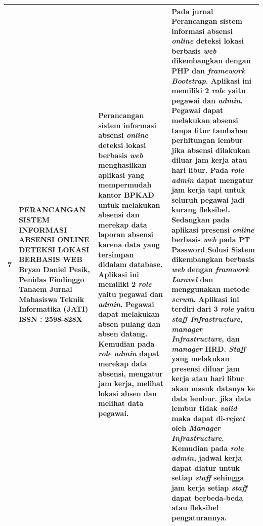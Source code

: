 \begin{longtable}{ |p{0.5cm}|p{3cm}|p{7cm}|p{12cm}|  }
   7 & PERANCANGAN SISTEM INFORMASI ABSENSI ONLINE DETEKSI LOKASI BERBASIS WEB
 \newline Bryan Daniel Pesik, Penidas Fiodinggo Tanaem
 \newline Jurnal Mahasiswa Teknik Informatika (JATI)
 \newline ISSN : 2598-828X
 & Perancangan sistem informasi absensi \textit{online} deteksi lokasi berbasis \textit{web} menghasilkan aplikasi yang mempermudah kantor BPKAD untuk melakukan absensi dan merekap data laporan absensi karena data yang tersimpan didalam database. Aplikasi ini memiliki 2 \textit{role} yaitu pegawai dan \textit{admin}. Pegawai dapat melakukan absen pulang dan absen datang. Kemudian pada \textit{role admin} dapat merekap data absensi, mengatur jam kerja, melihat lokasi absen dan melihat data pegawai.
 & Pada jurnal Perancangan sistem informasi absensi \textit{online} deteksi lokasi berbasis \textit{web} dikembangkan dengan PHP dan \textit{framework Bootstrap}. Aplikasi ini memiliki 2 \textit{role} yaitu pegawai dan \textit{admin}. Pegawai dapat melakukan absensi tanpa fitur tambahan perhitungan lembur jika absensi dilakukan diluar jam kerja atau hari libur. Pada \textit{role admin} dapat mengatur jam kerja tapi untuk seluruh pegawai jadi kurang fleksibel.
 \newline 
 \newline
 Sedangkan pada aplikasi presensi \textit{online} berbasis \textit{web} pada PT Password Solusi Sistem dikembangkan berbasis \textit{web} dengan \textit{framwork Laravel} dan menggunakan metode \textit{scrum}. Aplikasi ini terdiri dari 3 \textit{role} yaitu \textit{staff Infrastructure}, \textit{manager Infrastructure}, dan \textit{manager} HRD. \textit{Staff} yang melakukan presensi diluar jam kerja atau hari libur akan masuk datanya ke data lembur. jika data lembur tidak \textit{valid} maka dapat di-\textit{reject} oleh \textit{Manager Infrastructure}. Kemudian pada \textit{role admin}, jadwal kerja dapat diatur untuk setiap \textit{staff} sehingga jam kerja setiap \textit{staff} dapat berbeda-beda atau fleksibel pengaturannya.
 \\ \hline


\end{longtable}
